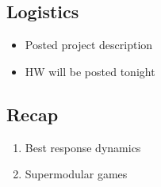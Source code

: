 \newsection
\subsection*{Logistics}
\begin{itemize}
    \item Posted project description
    \item HW will be posted tonight
\end{itemize}
\subsection*{Recap}
\begin{enumerate}
    \item Best response dynamics
    \item Supermodular games 
\end{enumerate}

